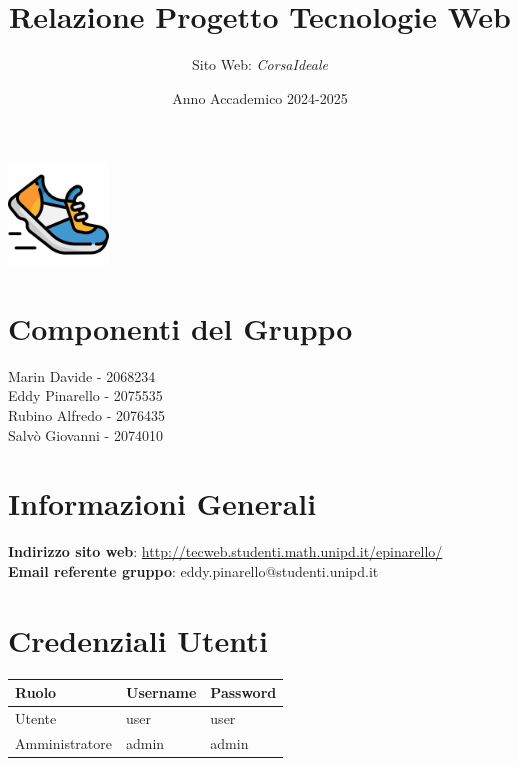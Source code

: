 \documentclass[a4paper, 12pt]{article}
\begin{document}
\title{\textbf{Relazione Progetto Tecnologie Web}}
\author{Sito Web: \textit{CorsaIdeale}}
\date{Anno Accademico 2024-2025}

\begin{center}
\maketitle

\includegraphics[width=0.2\textwidth]{logo.png}
\end{center}

\section*{\centering Componenti del Gruppo}
\begin{center}
Marin Davide - 2068234\\
\vspace{0.2cm}
Eddy Pinarello - 2075535\\
\vspace{0.2cm}
Rubino Alfredo - 2076435\\
\vspace{0.2cm}
Salvò Giovanni - 2074010
\end{center}

\section*{\centering Informazioni Generali}
\begin{center}
\textbf{Indirizzo sito web}: \url{http://tecweb.studenti.math.unipd.it/epinarello/}\\
\vspace{0.2cm}
\textbf{Email referente gruppo}: eddy.pinarello@studenti.unipd.it
\end{center}

\section*{\centering Credenziali Utenti}
\begin{center}
\begin{longtable}{|l|l|l|}
\hline
\rowcolor[HTML]{094074}
{\color[HTML]{FFFFFF} Ruolo} & {\color[HTML]{FFFFFF} Username} & {\color[HTML]{FFFFFF} Password}\\
\hline
Utente & user & user\\
\hline
Amministratore & admin & admin\\
\hline
\end{longtable}
\end{center}
\end{document}
